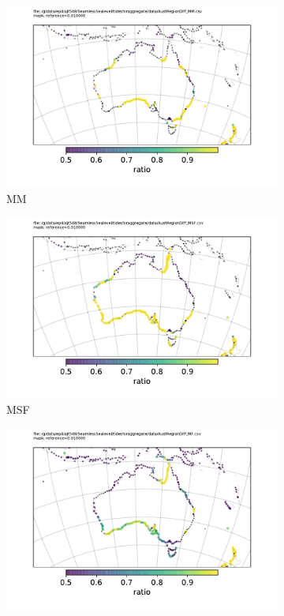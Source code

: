 \begin{figure}[h]
\begin{subfigure}[b]{\figwidthHalf}
    \end{subfigure}
    \begin{subfigure}[b]{\figwidthHalf}
        \includegraphics[width=\textwidth]{figures/maps/AustRegionDiff_MM.pdf}
        \caption{MM}
    \end{subfigure}
    \begin{subfigure}[b]{\figwidthHalf}
        \includegraphics[width=\textwidth]{figures/maps/AustRegionDiff_MSF.pdf}
        \caption{MSF}
    \end{subfigure}
    \begin{subfigure}[b]{\figwidthHalf}
        \includegraphics[width=\textwidth]{figures/maps/AustRegionDiff_MF.pdf}

\end{subfigure}
\end{figure}
